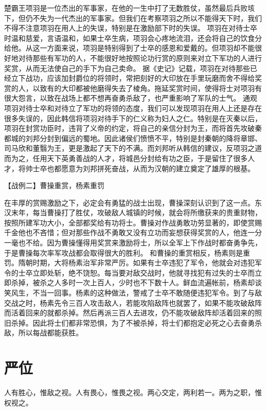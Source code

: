 \documentclass[a4paper,12pt,UTF8,twoside]{ctexbook}
\begin{document}
楚霸王项羽是一位杰出的军事家，在他的一生中打了无数胜仗，虽然最后兵败垓下，但仍不失为一代杰出的军事家。但我们在考察项羽之所以不能得天下时，我们不得不注意项羽在用人上的失误，特别是在激励部下时的失误。
项羽在对待士卒时温和慈爱，言语温和，如果士卒生病，项羽会心疼地流泪，还会将自己的饮食分给他。从这一方面来说，项羽是特别得到了士卒的感恩和爱戴的。但项羽却不能很好地对待那些有军功的人，不能很好地按照论功行赏的原则来对立下军功的人进行奖赏，从而无法使自己的手下为自己卖命。
据《史记》记载，项羽在对待那些已经立下战功，应该加封爵位的将领时，常把刻好的大印放在手里玩磨而舍不得给奖赏的人，以致有的大印都被他磨得失去了棱角。拖延奖赏时间，使得将士对项羽有很大怨言，以致在战场上都不想再奋勇杀敌了，也严重影响了军队的士气。
通观项羽对待士卒和对待立了军功的将领的态度，我们可以发现项羽在用人上还是存在很多失误的，因此韩信将项羽对待手下的仁义称为妇人之仁。特别是在灭秦以后，项羽在封赏功臣时，违背了义帝的约定，将自己的亲信分封为王，而将首先攻破秦都城的刘邦分封到偏远的蜀地。因此诸侯们愤愤不平，特别是封秦朝的降将章邯、司马欣和董翳为王，更是激起了天下的不满。而刘邦听从韩信的建议，反项羽之道而为之，任用天下英勇善战的人才，将城邑分封给有功之臣，于是留住了很多人才，将帅士卒也都愿意为刘邦拼死奋战，从而为汉朝的建立奠定了雄厚的根基。


【战例二】曹操重赏，杨素重罚

在丰厚的赏赐激励之下，必定会有勇猛的战士出现，曹操深刻认识到了这一点。东汉末年，每当曹操打了胜仗，攻破敌人城镇的时候，就会将所缴获来的贵重财物，按照所建军功大小，全部都奖给有功将士。曹操对作战勇敢功劳显著的，即使赏赐千金他也不吝惜；但对那些作战不勇敢又没有立功而妄想获得奖赏的人，他连一分一毫也不给。因为曹操懂得用奖赏来激励将士，所以全军上下作战时都奋勇争先，于是曹操每次率军攻战都会取得很大的胜利。
和曹操的重赏相反，杨素则是重罚。隋朝时期，大将杨素治军非常严厉。如果有士卒违犯了军令，他就会对违犯军令的士卒立即处斩，绝不饶恕。每当要对敌交战时，他就寻找犯有过失的士卒而立即杀掉，被杀之人多时一次上百人，少时也不下数十人。鲜血流遍帐前，杨素却谈笑风生，不当一回事。杨素的这种做法，警戒了士卒不敢随便违犯军令。到了与敌交战之时，杨素先令三百人攻击敌人，若能攻陷敌阵也就罢了，如果不能攻破敌阵而活着回来的就都杀掉。然后再派三百人去进攻，仍不能攻破敌阵却活着回来的照旧杀掉。因此将士们都非常恐惧，为了不被杀掉，将士们都抱定必死之心去奋勇杀敌，所以每战都能获胜。


\chapter{严位}

人有胜心，惟敌之视。人有畏心，惟畏之视。两心交定，两利若一。两为之职，惟权视之。
\end{document}
